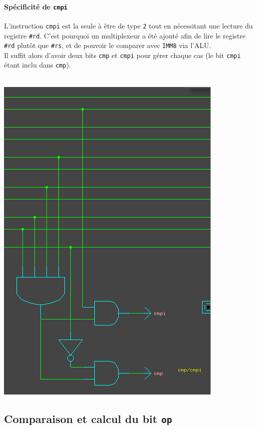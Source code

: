 \documentclass[11pt, a4paper, twoside, titlepage]{article}
\begin{document}
\paragraph{Spécificité de \texttt{cmpi}}
L'instruction \texttt{cmpi} est la seule à être de type \texttt{2} tout en nécessitant une lecture du registre \texttt{\#rd}. C'est pourquoi un multiplexeur a été ajouté afin de lire le registre \texttt{\#rd} plutôt que \texttt{\#rs}, et de pouvoir le comparer avec \texttt{IMM8} via l'ALU.\\
Il suffit alors d'avoir deux bits \texttt{cmp} et \texttt{cmpi} pour gérer chaque cas (le bit \texttt{cmpi} étant inclu dans \texttt{cmp}).\\
\\
\centerline{\includegraphics[width=.5 \textwidth]{log_cmp}}

\subsection{Comparaison et calcul du bit \texttt{op}}
\end{document}
